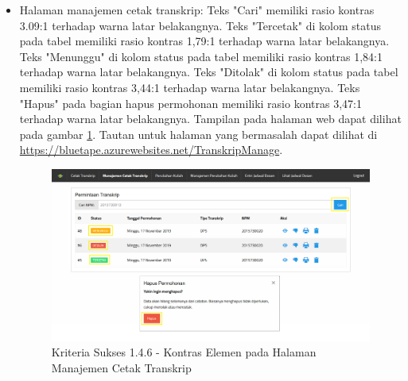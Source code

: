 \documentclass[a4paper,twoside]{article}
\begin{document}
\begin{enumerate}
\begin{itemize}
			\item Halaman manajemen cetak transkrip: Teks "Cari" memiliki rasio kontras 3.09:1 terhadap warna latar belakangnya. Teks "Tercetak" di kolom status pada tabel memiliki rasio kontras 1,79:1 terhadap warna latar belakangnya. Teks "Menunggu" di kolom status pada tabel memiliki rasio kontras 1,84:1 terhadap warna latar belakangnya. Teks "Ditolak" di kolom status pada tabel memiliki rasio kontras 3,44:1 terhadap warna latar belakangnya. Teks "Hapus" pada bagian hapus permohonan memiliki rasio kontras 3,47:1 terhadap warna latar belakangnya. Tampilan pada halaman web dapat dilihat pada gambar \ref{fig:1.4.6_contrast_enchanced_3}. Tautan untuk halaman yang bermasalah dapat dilihat di \url{https://bluetape.azurewebsites.net/TranskripManage}.
			\begin{figure}[H]
				\centering  
				\includegraphics[scale=0.3, frame]{kriteria-sukses-1-4-6-contrast-enchanced-3}  
				\caption[Kriteria Sukses 1.4.6 - Kontras Elemen pada Halaman Manajemen Cetak Transkrip]{Kriteria Sukses 1.4.6 - Kontras Elemen pada Halaman Manajemen Cetak Transkrip}
				\label{fig:1.4.6_contrast_enchanced_3}  
			\end{figure} 
			

\end{itemize}
\end{enumerate}
\end{document}
